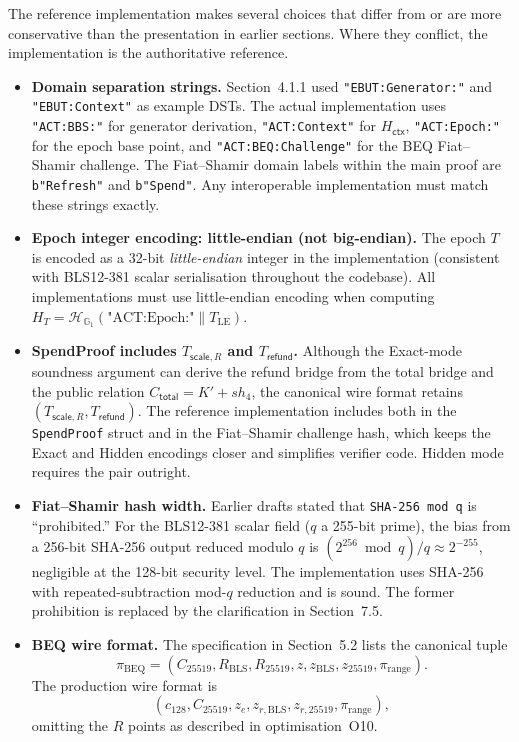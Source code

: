\documentclass[11pt]{article}
\theoremstyle{definitionstyle}
\theoremstyle{plain}
\begin{document}
The reference implementation makes several choices that differ from or are
more conservative than the presentation in earlier sections.  Where they
conflict, the implementation is the authoritative reference.

\begin{itemize}[leftmargin=*]

\item \textbf{Domain separation strings.}
  Section~4.1.1 used \texttt{"EBUT:Generator:"} and \texttt{"EBUT:Context"}
  as example DSTs.  The actual implementation uses \texttt{"ACT:BBS:"} for
  generator derivation, \texttt{"ACT:Context"} for $H_{\mathsf{ctx}}$,
  \texttt{"ACT:Epoch:"} for the epoch base point, and
  \texttt{"ACT:BEQ:Challenge"} for the BEQ Fiat--Shamir challenge.  The
  Fiat--Shamir domain labels within the main proof are \texttt{b"Refresh"}
  and \texttt{b"Spend"}.  Any interoperable implementation must match these
  strings exactly.

\item \textbf{Epoch integer encoding: little-endian (not big-endian).}
  The epoch $T$ is encoded as a 32-bit \emph{little-endian} integer in the
  implementation (consistent with BLS12-381 scalar serialisation throughout
  the codebase).  All implementations must use little-endian encoding when
  computing $H_T = \mathcal{H}_{\mathbb{G}_1}(\text{"ACT:Epoch:"} \parallel
  T_{\text{LE}})$.

\item \textbf{SpendProof includes $T_{\mathsf{scale},R}$ and $T_{\mathsf{refund}}$.}
  Although the Exact-mode soundness argument can derive the refund bridge from
  the total bridge and the public relation $C_{\mathsf{total}} = K' + s h_4$,
  the canonical wire format retains $(T_{\mathsf{scale},R},
  T_{\mathsf{refund}})$.  The reference implementation includes both in the
  \texttt{SpendProof} struct and in the Fiat--Shamir challenge hash, which
  keeps the Exact and Hidden encodings closer and simplifies verifier code.
  Hidden mode requires the pair outright.

\item \textbf{Fiat--Shamir hash width.}
  Earlier drafts stated that \texttt{SHA-256~mod~q} is ``prohibited.''  For
  the BLS12-381 scalar field ($q$ a 255-bit prime), the bias from a 256-bit
  SHA-256 output reduced modulo $q$ is $(2^{256} \bmod q)/q \approx 2^{-255}$,
  negligible at the 128-bit security level.  The implementation uses SHA-256
  with repeated-subtraction mod-$q$ reduction and is sound.  The former
  prohibition is replaced by the clarification in Section~7.5.

\item \textbf{BEQ wire format.}
  The specification in Section~5.2 lists the canonical tuple
  \[
  \pi_{\text{BEQ}} = (C_{25519}, R_{\text{BLS}}, R_{25519}, z, z_{\text{BLS}}, z_{25519}, \pi_{\text{range}}).
  \]
  The production wire format is
  \[
  (c_{128}, C_{25519}, z_e, z_{r,\text{BLS}}, z_{r,25519}, \pi_{\text{range}}),
  \]
  omitting the $R$ points as described in optimisation~O10.

\end{itemize}
\end{document}
